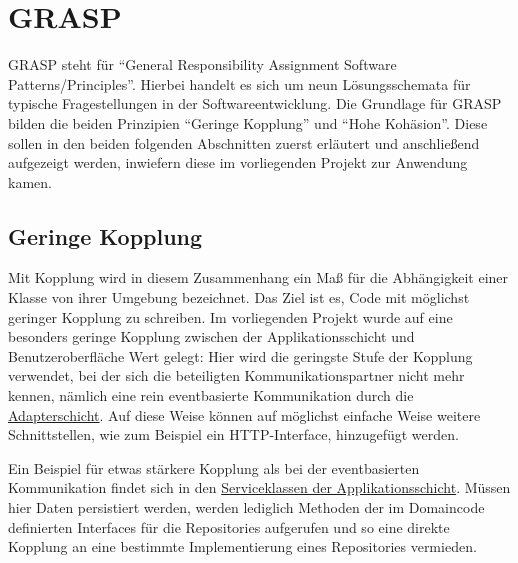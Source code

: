 \section{GRASP}
GRASP steht für \enquote{General Responsibility Assignment Software Patterns/Principles}. Hierbei handelt es sich um neun Lösungsschemata für typische Fragestellungen in der Softwareentwicklung. Die Grundlage für GRASP bilden die beiden Prinzipien \enquote{Geringe Kopplung} und \enquote{Hohe Kohäsion}. Diese sollen in den beiden folgenden Abschnitten zuerst erläutert und anschließend aufgezeigt werden, inwiefern diese im vorliegenden Projekt zur Anwendung kamen.

\subsection{Geringe Kopplung}
Mit Kopplung wird in diesem Zusammenhang ein Maß für die Abhängigkeit einer Klasse von ihrer Umgebung bezeichnet. Das Ziel ist es, Code mit möglichst geringer Kopplung zu schreiben. Im vorliegenden Projekt wurde auf eine besonders geringe Kopplung zwischen der Applikationsschicht und Benutzeroberfläche Wert gelegt: Hier wird die geringste Stufe der Kopplung verwendet, bei der sich die beteiligten Kommunikationspartner nicht mehr kennen, nämlich eine rein eventbasierte Kommunikation durch die \href{https://github.com/anditru/quickie/tree/bb41442c7f1ffbfcd3117cd86a40f7932e543a33/1-quickie-adapters}{Adapterschicht}. Auf diese Weise können auf möglichst einfache Weise weitere Schnittstellen, wie zum Beispiel ein HTTP-Interface, hinzugefügt werden.

Ein Beispiel für etwas stärkere Kopplung als bei der eventbasierten Kommunikation findet sich in den \href{https://github.com/anditru/quickie/tree/bb41442c7f1ffbfcd3117cd86a40f7932e543a33/2-quickie-application/src/main/java/org/pinkcrazyunicorn/quickie/application}{Serviceklassen der Applikationsschicht}. Müssen hier Daten persistiert werden, werden lediglich Methoden der im Domaincode definierten Interfaces für die Repositories aufgerufen und so eine direkte Kopplung an eine bestimmte Implementierung eines Repositories vermieden.

